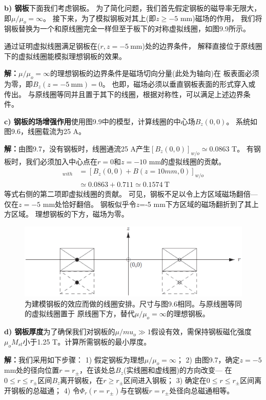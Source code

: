 \textbf{b) 钢板}\qquad 下面我们考虑钢板。
为了简化问题，我们首先假定钢板的磁导率无限大，即$\mu/\mu_o=\infty$。
接下来，为了模拟钢板对其上(即$z\ge -5$ mm)磁场的作用，
我们将钢板替换为一个和原线圈完全一样但至于板下的对称虚拟线圈，如图9.9所示。

通过证明虚拟线圈满足钢板在($r,z=-5\ \mathrm{mm}$)处的边界条件，
解释直接位于原线圈下的虚拟线圈能模拟理想钢板的效果。

\textbf{解：}$\mu/\mu_o=\infty$的理想钢板的边界条件是磁场切向分量(此处为轴向)在
板表面必须为零，即$B_z(z=-5\ \mathrm{mm})=0$。
也即，磁场必须以垂直钢板表面的形式穿入或传出。
与原线圈等同并且置于其下的线圈，根据对称性，可以满足上述边界条件。

\textbf{c) 钢板的场增强作用}\qquad 使用图9.9中的模型，计算线圈的中心场$B_z(0,0)$。
系统如图9.6，线圈载流为25 A。

\textbf{解：}由图9.7，没有钢板时，线圈通流25 A产生$[B_z(0,0)]_{w/o}\simeq 0.0863$ T。
有钢板时，我们必须加入中心点在$r=0$和$z=-10$ mm的虚拟线圈的贡献。
\begin{align*}%
[B_{z}(0,0)]_{with}&=[B_{z}(0,0)+B(z=10mm,0)]_{w/o}\\
&\simeq 0.0863+0.711\simeq 0.1574\ \mathrm{T}
\end{align*}
等式右侧的第二项即虚拟线圈的贡献。
可见，钢板不足以令上方区域磁场翻倍---仅在$z=-5$ mm处恰好翻倍。
钢板似乎令$z$=-5 mm下方区域的磁场翻折到了其上方区域。
理想钢板的下方，磁场为零。

\begin{figure}
	\centering
	\includegraphics[scale=0.5]{chpt9/figs/fig9.9.eps}
	\caption{为建模钢板的效应而做的线圈安排。尺寸与图9.6相同。与原线圈等同的虚拟线圈置于
	原线圈下方，替代$\mu/\mu_o=\infty$的理想钢板。}
\end{figure}

\textbf{d) 钢板厚度}\qquad 为了确保我们对钢板的$\mu/mu_o\gg 1$假设有效，需保持钢板磁化强度$\mu_o M_{st}$小于1.25 T。计算所需钢板的最小厚度。

\textbf{解：}我们采用如下步骤：
1) 假定钢板为理想$\mu/\mu_o=\infty$；
2) 由图9.7，确定$z=-5$ mm处的径向位置$r=r_{\pm}$，在该处总$B_z$(实线圈和虚线圈)的方向改变---
在$0\le r\le r_{\pm}$区间$B_z$离开钢板，在$r\ge r_{\pm}$区间进入钢板；
3) 确定在$0\le r\le r_{\pm}$区间离开钢板的总磁通；
4) 令$\Phi_r(r=r_{\pm})$与在钢板$r=r_{\pm}$处径向总磁通相等。

